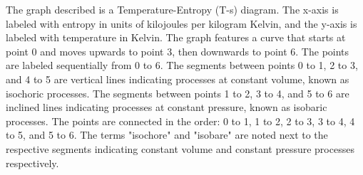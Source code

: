 The graph described is a Temperature-Entropy (T-s) diagram. The x-axis is labeled with entropy in units of kilojoules per kilogram Kelvin, and the y-axis is labeled with temperature in Kelvin. The graph features a curve that starts at point 0 and moves upwards to point 3, then downwards to point 6. The points are labeled sequentially from 0 to 6. The segments between points 0 to 1, 2 to 3, and 4 to 5 are vertical lines indicating processes at constant volume, known as isochoric processes. The segments between points 1 to 2, 3 to 4, and 5 to 6 are inclined lines indicating processes at constant pressure, known as isobaric processes. The points are connected in the order: 0 to 1, 1 to 2, 2 to 3, 3 to 4, 4 to 5, and 5 to 6. The terms "isochore" and "isobare" are noted next to the respective segments indicating constant volume and constant pressure processes respectively.